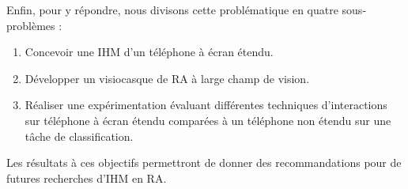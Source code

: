Enfin, pour y répondre, nous divisons cette problématique en quatre sous-problèmes :
\begin{enumerate}
  \item Concevoir une IHM d'un téléphone à écran étendu.
  \item Développer un visiocasque de RA à large champ de vision.
  \item Réaliser une expérimentation évaluant différentes techniques d'interactions sur téléphone à écran étendu comparées à un téléphone non étendu sur une tâche de classification.
\end{enumerate}

Les résultats à ces objectifs permettront de donner des recommandations pour de futures recherches d'IHM en RA.